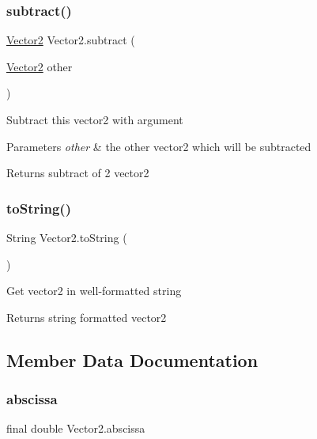 \subsubsection{\texorpdfstring{subtract()}{subtract()}}
{\footnotesize\ttfamily \mbox{\hyperlink{class_vector2}{Vector2}} Vector2.\+subtract (\begin{DoxyParamCaption}\item[{\mbox{\hyperlink{class_vector2}{Vector2}}}]{other }\end{DoxyParamCaption})\hspace{0.3cm}{\ttfamily [inline]}}

Subtract this vector2 with argument 
\begin{DoxyParams}{Parameters}
{\em other} & the other vector2 which will be subtracted \\
\hline
\end{DoxyParams}
\begin{DoxyReturn}{Returns}
subtract of 2 vector2 
\end{DoxyReturn}
\mbox{\label{class_vector2_a8c4f6580158ce1d9a70c991de2afca86}} 
\subsubsection{\texorpdfstring{to\+String()}{toString()}}
{\footnotesize\ttfamily String Vector2.\+to\+String (\begin{DoxyParamCaption}{ }\end{DoxyParamCaption})\hspace{0.3cm}{\ttfamily [inline]}}

Get vector2 in well-\/formatted string \begin{DoxyReturn}{Returns}
string formatted vector2 
\end{DoxyReturn}


\subsection{Member Data Documentation}
\mbox{\label{class_vector2_aadec5169cf1887537f1c7d60f87e137f}} 
\subsubsection{\texorpdfstring{abscissa}{abscissa}}
{\footnotesize\ttfamily final double Vector2.\+abscissa}

